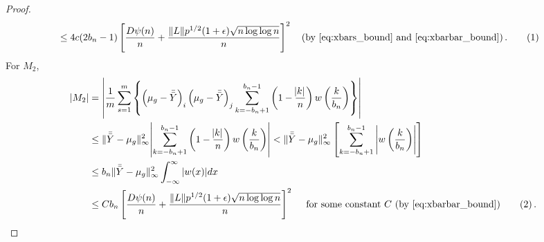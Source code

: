 \documentclass[11pt]{article}
\newcommand\numberthis{\addtocounter{equation}{1}\tag{\theequation}}
\theoremstyle{remark}
\begin{document}
\begin{proof}
\begin{align*}
    & \leq 4c(2b_n - 1)\left[ \dfrac{D \psi(n)}{n} + \dfrac{\|L\| p^{1/2}(1+\epsilon)\sqrt{n \log\log n}}{n}  \right]^2  \quad \text{(by \eqref{eq:xbars_bound} and \eqref{eq:xbarbar_bound})}\,. \numberthis \label{eq:strong_consis_term-1}
\end{align*}
%
%
For $M_2$,
\begin{align*}
   |M_2| & = \left|\dfrac{1}{m}\sum\limits_{s=1}^{m}\left\{ \left(\mu_g - \bar{\bar{Y}} \right)_i  \left(\mu_g - \bar{\bar{Y}} \right)_j\sum_{k=-b_n+1}^{b_n-1}\left(1-\dfrac{\abs{k}}{n}\right)w\left(\dfrac{k}{b_n}\right)\right\}\right|\\
    & \leq\|\bar{\bar{Y}} - \mu_g\|_{\infty}^2\abs{\sum_{k=-b_n+1}^{b_n-1}\left(1-\dfrac{\abs{k}}{n}\right)w\left(\dfrac{k}{b_n}\right)} < \|\bar{\bar{Y}} - \mu_g\|_{\infty}^2\left[\sum_{k=-b_n+1}^{b_n-1}\left|w\left(\dfrac{k}{b_n}\right)\right|\right]\\
    & \leq b_n\|\bar{\bar{Y}} - \mu_g\|_{\infty}^2 \int_{-\infty}^{\infty}|w(x)|dx \\
    & \leq Cb_n\left[ \dfrac{D \psi(n)}{n} + \dfrac{\|L\| p^{1/2}(1+\epsilon)\sqrt{n \log\log n}}{n}  \right]^2 \quad \text{ for some constant $C$ (by \eqref{eq:xbarbar_bound})} \numberthis \label{eq:strong_consis_term-2} \,.
\end{align*}
%
%
%

\end{proof}
\end{document}
